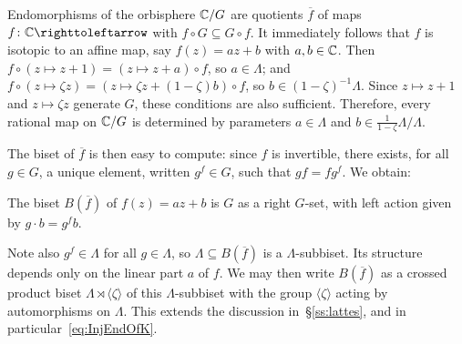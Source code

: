 \documentclass{amsart}
\begin{document}
\begin{center}
\end{center}

Endomorphisms of the orbisphere ${\mathbb C}/G$ are quotients $\overline f$ of
maps $f\colon\C\selfmap$ with $f\circ G\subseteq G\circ f$. It
immediately follows that $f$ is isotopic to an affine map, say
$f(z)=a z+b$ with $a,b\in{\mathbb C}$. Then
$f\circ(z\mapsto z+1)=(z\mapsto z+a)\circ f$, so $a\in\Lambda$; and
$f\circ(z\mapsto\zeta z)=(z\mapsto\zeta z+(1-\zeta)b)\circ f$, so
$b\in(1-\zeta)^{-1}\Lambda$. Since $z\mapsto z+1$ and
$z\mapsto\zeta z$ generate $G$, these conditions are also
sufficient. Therefore, every rational map on ${\mathbb C}/G$ is determined by
parameters $a\in\Lambda$ and $b\in\frac1{1-\zeta}\Lambda/\Lambda$.

The biset of $\overline f$ is then easy to compute: since $f$ is
invertible, there exists, for all $g\in G$, a unique element, written
$g^f\in G$, such that $g f=f g^f$. We obtain:
\begin{prop}
  The biset $B(\overline f)$ of $f(z)=a z+b$ is $G$ as a right $G$-set,
  with left action given by $g\cdot b=g^f b$.
\end{prop}

Note also $g^f\in\Lambda$ for all $g\in\Lambda$, so
$\Lambda\subseteq B(\overline f)$ is a $\Lambda$-subbiset. Its
structure depends only on the linear part $a$ of $f$. We may then
write $B(\overline f)$ as a crossed product biset
$\Lambda\rtimes\langle\zeta\rangle$ of this $\Lambda$-subbiset with
the group $\langle\zeta\rangle$ acting by automorphisms on
$\Lambda$. This extends the discussion in~\S\ref{ss:lattes}, and in
particular~\eqref{eq:InjEndOfK}.
\end{document}
